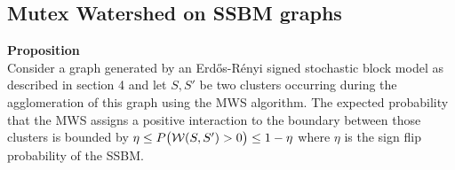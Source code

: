 
\subsection{Mutex Watershed on SSBM graphs}
\textbf{Proposition} \\
Consider a graph generated by an Erd\H os-R\'enyi signed stochastic block model as described in section 4 and let $S, S'$ be two clusters occurring during the agglomeration of this graph using the MWS algorithm. The expected probability that the MWS assigns a positive interaction to the boundary between those clusters is bounded by $\eta \leq P\big(\mathcal{W}(S,S')>0\big) \leq 1-\eta$ where $\eta$ is the sign flip probability of the SSBM.


